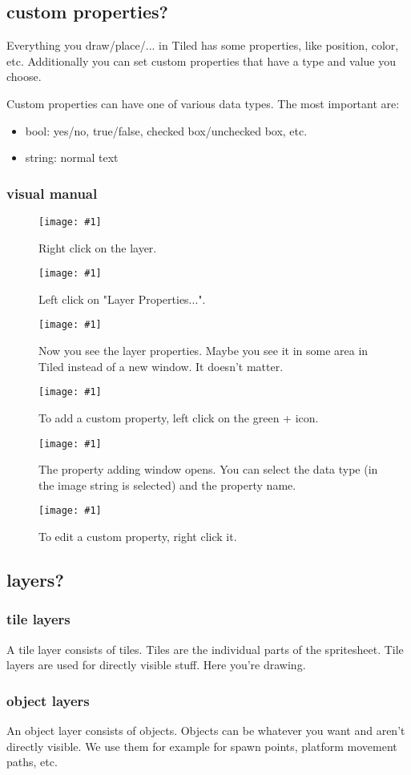 \documentclass{article}
\newcommand{\erklaerbild}[2]{
	\begin{figure}[H]
		\center
		\texttt{[image: \#1]}
		\caption{#2}
	\end{figure}
}
\begin{document}
\subsection{custom properties?}
Everything you draw/place/... in Tiled has some properties, like position, color, etc. Additionally you can set custom properties that have a type and value you choose.

Custom properties can have one of various data types. The most important are:
\begin{itemize}
	\item bool: yes/no, true/false, checked box/unchecked box, etc.
	\item string: normal text
\end{itemize}

\subsubsection{visual manual}
\erklaerbild
	{custom_prop_1_edit.png}
	{Right click on the layer.}

\erklaerbild
	{custom_prop_2_edit.png}
	{Left click on "Layer Properties...".}

\erklaerbild
	{custom_prop_3.png}
	{Now you see the layer properties. Maybe you see it in some area in Tiled instead of a new window. It doesn't matter.}

\erklaerbild
	{custom_prop_4_edit.png}
	{To add a custom property, left click on the green + icon.}

\erklaerbild
	{custom_prop_5_edit.png}
	{The property adding window opens. You can select the data type (in the image string is selected) and the property name.}

\erklaerbild
	{custom_prop_6_edit.png}
	{To edit a custom property, right click it.}

\subsection{layers?}
\subsubsection{tile layers}
A tile layer consists of tiles. Tiles are the individual parts of the spritesheet. Tile layers are used for directly visible stuff. Here you're drawing.

\subsubsection{object layers}
An object layer consists of objects. Objects can be whatever you want and aren't directly visible. We use them for example for spawn points, platform movement paths, etc.
\end{document}
